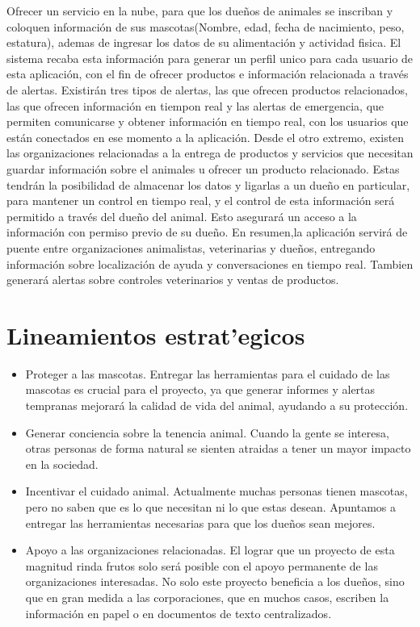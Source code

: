\documentclass[letterpaper,openright,10pt,oneside]{report}
\begin{document}
			Ofrecer un servicio en la nube, para que los dueños de animales se inscriban y coloquen información de sus mascotas(Nombre, edad, fecha de nacimiento, peso, estatura), ademas de ingresar los datos de su alimentación y actividad fisica. El sistema recaba esta información para generar un perfil unico para cada usuario de esta aplicación, con el fin de ofrecer productos e información relacionada a través de alertas.
			Existirán tres tipos de alertas, las que ofrecen productos relacionados, las que ofrecen información en tiempon real y las alertas de emergencia, que permiten comunicarse y obtener información en tiempo real, con los usuarios que están conectados en ese momento a la aplicación.
			Desde el otro extremo, existen las organizaciones relacionadas a la entrega de productos y servicios que necesitan guardar información sobre el animales u ofrecer un producto relacionado. Estas tendrán la posibilidad de almacenar los datos y ligarlas a un dueño en particular, para mantener un control en tiempo real, y el control de esta información será permitido a través del dueño del animal. Esto asegurará un acceso a la información con permiso previo de su dueño.
		En resumen,la aplicación servirá de puente entre organizaciones animalistas, veterinarias y dueños, entregando información sobre localización de ayuda y conversaciones en tiempo real. Tambien generará alertas sobre controles veterinarios y ventas de productos.
	
		\section{Lineamientos estrat'egicos}
\begin{itemize}
	\item Proteger a las mascotas.\newline
	Entregar las herramientas para el cuidado de las mascotas es crucial para el proyecto, ya que generar informes y alertas tempranas mejorará la calidad de vida del animal, ayudando a su protección.
	\item Generar conciencia sobre la tenencia animal.\newline
	Cuando la gente se interesa, otras personas de forma natural se sienten atraidas a tener un mayor impacto en la sociedad.
	\item Incentivar el cuidado animal.\newline
	Actualmente muchas personas tienen mascotas, pero no saben que es lo que necesitan ni lo que estas desean. Apuntamos a entregar las herramientas necesarias para que los dueños sean mejores.
	\item Apoyo a las organizaciones relacionadas.\newline
	El lograr que un proyecto de esta magnitud rinda frutos solo será posible con el apoyo permanente de las organizaciones interesadas. No solo este proyecto beneficia a los dueños, sino que en gran medida a las corporaciones, que en muchos casos, escriben la información en papel o en documentos de texto centralizados.
\end{itemize}
\end{document}
